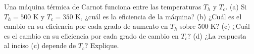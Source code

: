 \item Una máquina térmica de Carnot funciona entre las temperaturas $T_h$ y $T_c$. (a) Si $T_h = 500\text{ K}$ y $T_c = 350\text{ K}$, ¿cuál es la eficiencia de la máquina? (b) ¿Cuál es el cambio en su eficiencia por cada grado de aumento en $T_h$ sobre $500\text{ K}$? (c) ¿Cuál es el cambio en su eficiencia por cada grado de cambio en $T_c$? (d) ¿La respuesta al inciso (c) depende de $T_c$? Explique.
